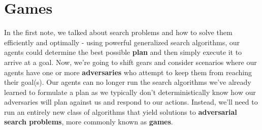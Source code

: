 \documentclass[11pt,fleqn]{article}
\def\title{Note \the\lecturenumber}
\begin{document}
\maketitle

\section*{Games}
In the first note, we talked about search problems and how to solve them efficiently and optimally - using powerful generalized search algorithms, our agents could determine the best possible \textbf{plan} and then simply execute it to arrive at a goal. Now, we're going to shift gears and consider scenarios where our agents have one or more \textbf{adversaries} who attempt to keep them from reaching their goal(s). Our agents can no longer run the search algorithms we've already learned to formulate a plan as we typically don't deterministically know how our adversaries will plan against us and respond to our actions. Instead, we'll need to run an entirely new class of algorithms that yield solutions to \textbf{adversarial search problems}, more commonly known as \textbf{games}.


\end{document}
\end{document}
